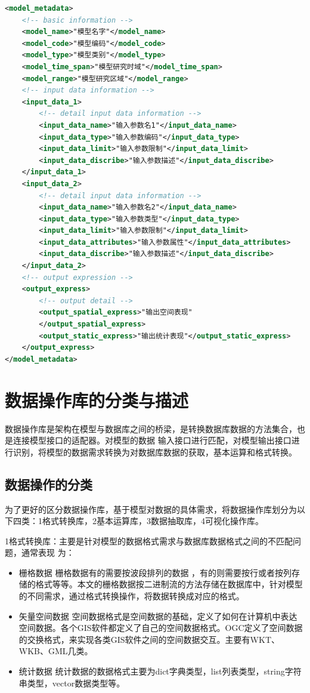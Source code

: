 \documentclass[master]{njnuthesis}
\begin{document}
\begin{lstlisting}[language=xml]
<model_metadata>
    <!-- basic information -->
    <model_name>"模型名字"</model_name>
    <model_code>"模型编码"</model_code>
    <model_type>"模型类别"</model_type>
    <model_time_span>"模型研究时域"</model_time_span>
    <model_range>"模型研究区域"</model_range>
    <!-- input data information -->
    <input_data_1>
        <!-- detail input data information -->
        <input_data_name>"输入参数名1"</input_data_name>
        <input_data_type>"输入参数编码"</input_data_type>
        <input_data_limit>"输入参数限制"</input_data_limit>
        <input_data_discribe>"输入参数描述"</input_data_discribe>
    </input_data_1>
    <input_data_2>
        <!-- detail input data information -->
        <input_data_name>"输入参数名2"</input_data_name>
        <input_data_type>"输入参数类型"</input_data_type>
        <input_data_limit>"输入参数限制"</input_data_limit>
        <input_data_attributes>"输入参数属性"</input_data_attributes>
        <input_data_discribe>"输入参数描述"</input_data_discribe>
    </input_data_2>
    <!-- output expression -->
    <output_express>
        <!-- output detail -->
        <output_spatial_express>"输出空间表现"
		</output_spatial_express>
        <output_static_express>"输出统计表现"</output_static_express>
    </output_express>
</model_metadata>
\end{lstlisting}

\section{数据操作库的分类与描述}
数据操作库是架构在模型与数据库之间的桥梁，是转换数据库数据的方法集合，也是连接模型接口的适配器。对模型的数据 输入接口进行匹配，对模型输出接口进行识别，将模型的数据需求转换为对数据库数据的获取，基本运算和格式转换。

\subsection{数据操作的分类}
为了更好的区分数据操作库，基于模型对数据的具体需求，将数据操作库划分为以下四类：1格式转换库，2基本运算库，3数据抽取库，4可视化操作库。

1格式转换库：主要是针对模型的数据格式需求与数据库数据格式之间的不匹配问题，通常表现 为：
\begin{itemize}
\item 栅格数据
栅格数据有的需要按波段排列的数据 ，有的则需要按行或者按列存储的格式等等。本文的栅格数据按二进制流的方法存储在数据库中，针对模型 的不同需求，通过格式转换操作，将数据转换成对应的格式。
\item 矢量空间数据
空间数据格式是空间数据的基础，定义了如何在计算机中表达空间数据。各个GIS软件都定义了自己的空间数据格式。OGC定义了空间数据的交换格式，来实现各类GIS软件之间的空间数据交互。主要有WKT、WKB、GML几类。
\item 统计数据
统计数据的数据格式主要为dict字典类型，list列表类型，string字符串类型，vector数据类型等。

\end{itemize}
\end{document}
